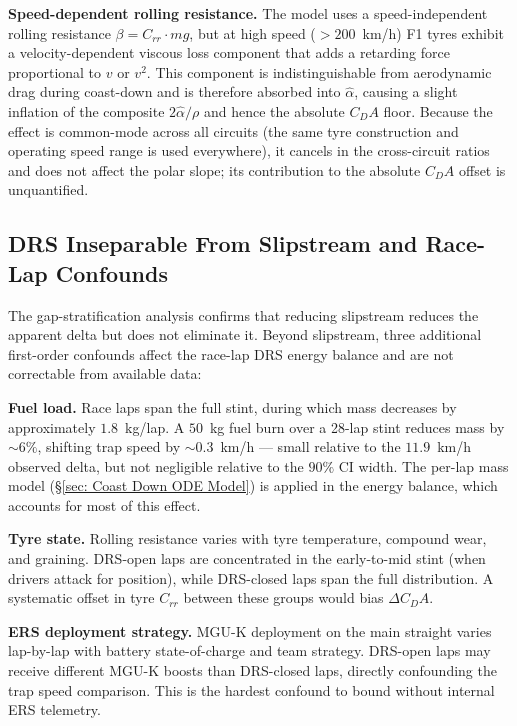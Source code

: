 \textbf{Speed-dependent rolling resistance.} The model uses a speed-independent rolling resistance $\beta = C_{rr}\cdot mg$, but at high speed ($>200$~km/h) F1 tyres exhibit a velocity-dependent viscous loss component that adds a retarding force proportional to $v$ or $v^2$. This component is indistinguishable from aerodynamic drag during coast-down and is therefore absorbed into $\hat\alpha$, causing a slight inflation of the composite $2\hat\alpha/\rho$ and hence the absolute $C_DA$ floor. Because the effect is common-mode across all circuits (the same tyre construction and operating speed range is used everywhere), it cancels in the cross-circuit ratios and does not affect the polar slope; its contribution to the absolute $C_DA$ offset is unquantified.

\subsection{DRS Inseparable From Slipstream and Race-Lap Confounds}
\label{sec: DRS Inseparable From Slipstream}

The gap-stratification analysis confirms that reducing slipstream reduces the apparent delta but does not eliminate it. Beyond slipstream, three additional first-order confounds affect the race-lap DRS energy balance and are not correctable from available data:

\textbf{Fuel load.} Race laps span the full stint, during which mass decreases by approximately $1.8$~kg/lap. A $50$~kg fuel burn over a 28-lap stint reduces mass by $\sim 6\%$, shifting trap speed by $\sim 0.3$~km/h --- small relative to the $11.9$~km/h observed delta, but not negligible relative to the $90\%$ CI width. The per-lap mass model (\S\ref{sec: Coast Down ODE Model}) is applied in the energy balance, which accounts for most of this effect.

\textbf{Tyre state.} Rolling resistance varies with tyre temperature, compound wear, and graining. DRS-open laps are concentrated in the early-to-mid stint (when drivers attack for position), while DRS-closed laps span the full distribution. A systematic offset in tyre $C_{rr}$ between these groups would bias $\Delta C_DA$.

\textbf{ERS deployment strategy.} MGU-K deployment on the main straight varies lap-by-lap with battery state-of-charge and team strategy. DRS-open laps may receive different MGU-K boosts than DRS-closed laps, directly confounding the trap speed comparison. This is the hardest confound to bound without internal ERS telemetry.

